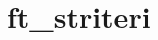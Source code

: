 \chapter{ft\+\_\+striteri}
\hypertarget{md_Documentation_2ft__striteri}{}\label{md_Documentation_2ft__striteri}
